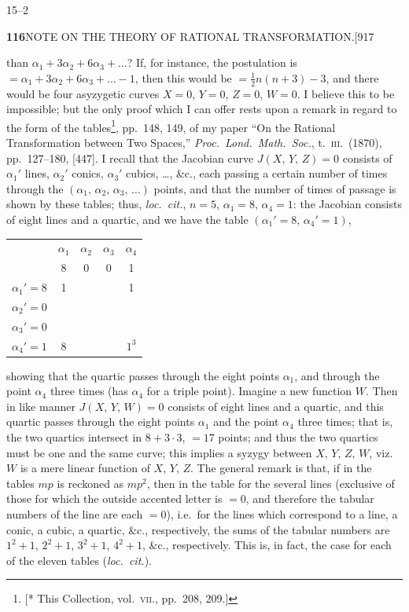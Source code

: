 \documentclass[11pt]{article}
\begin{document}
\hfill 15--2

\newpage
\noindent\textbf{116}\hfill NOTE ON THE THEORY OF RATIONAL TRANSFORMATION.\hfill[917

\smallskip
than $\alpha_{1}+3\alpha_{2}+6\alpha_{3}+\ldots$? If, for instance, the
postulation is $=\alpha_{1}+3\alpha_{2}+6\alpha_{3}+\ldots-1$, then this
would be $=\tfrac{1}{2}n(n+3)-3$, and there would be four asyzygetic curves
$X=0$, $Y=0$, $Z=0$, $W=0$. I believe this to be impossible; but the only
proof which I can offer rests upon a remark in regard to the form of the
tables\footnote{[* This Collection, vol.\ \textsc{vii}., pp.\ 208, 209.]}, pp.\
148, 149, of my paper ``On the Rational Transformation between Two Spaces,''
\emph{Proc.\ Lond.\ Math.\ Soc.}, t.\ \textsc{iii}.\ (1870), pp.\ 127--180,
[447]. I recall that the Jacobian curve $J(X,\,Y,\,Z)=0$ consists of
$\alpha_{1}'$ lines, $\alpha_{2}'$ conics, $\alpha_{3}'$ cubics, \ldots,
\&c., each passing a certain number of times through the
$(\alpha_{1},\,\alpha_{2},\,\alpha_{3},\,\ldots)$ points, and that the number
of times of passage is shown by these tables; thus, \emph{loc.\ cit.},
$n=5$, $\alpha_{1}=8$, $\alpha_{4}=1$: the Jacobian consists of eight lines
and a quartic, and we have the table $(\alpha_{1}'=8,\,\alpha_{4}'=1)$,

\smallskip
\begin{center}
\renewcommand{\arraystretch}{1.2}
\begin{tabular}{|c|c|c|c|c|}
\hline
 & $\alpha_{1}$ & $\alpha_{2}$ & $\alpha_{3}$ & $\alpha_{4}$\\
 & 8 & 0 & 0 & 1\\
\hline
$\alpha_{1}'=8$ & 1 & & & 1\\
\hline
$\alpha_{2}'=0$ & & & & \\
\hline
$\alpha_{3}'=0$ & & & & \\
\hline
$\alpha_{4}'=1$ & 8 & & & $1^{3}$\\
\hline
\end{tabular}
\end{center}

\smallskip
showing that the quartic passes through the eight points $\alpha_{1}$, and
through the point $\alpha_{4}$ three times (has $\alpha_{4}$ for a triple
point). Imagine a new function $W$. Then in like manner $J(X,\,Y,\,W)=0$
consists of eight lines and a quartic, and this quartic passes through the
eight points $\alpha_{1}$ and the point $\alpha_{4}$ three times; that is,
the two quartics intersect in $8+3\cdot 3$, $=17$ points; and thus the two
quartics must be one and the same curve; this implies a syzygy between
$X,\,Y,\,Z,\,W$, viz.\ $W$ is a mere linear function of $X,\,Y,\,Z$. The
general remark is that, if in the tables $mp$ is reckoned as $mp^{2}$, then
in the table for the several lines (exclusive of those for which the outside
accented letter is $=0$, and therefore the tabular numbers of the line are
each $=0$), i.e.\ for the lines which correspond to a line, a conic, a cubic,
a quartic, \&c., respectively, the sums of the tabular numbers are $1^{2}+1$,
$2^{2}+1$, $3^{2}+1$, $4^{2}+1$, \&c., respectively. This is, in fact, the
case for each of the eleven tables (\emph{loc.\ cit.}).
\end{document}
